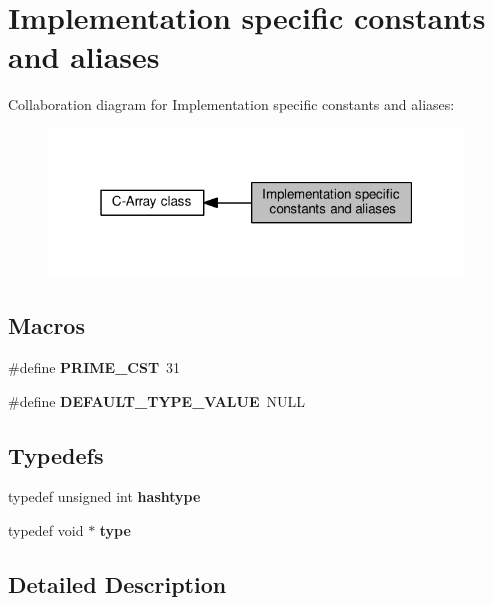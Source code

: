 \section{Implementation specific constants and aliases}
\label{group__impl__group}
Collaboration diagram for Implementation specific constants and aliases\+:\nopagebreak
\begin{figure}[H]
\begin{center}
\leavevmode
\includegraphics[width=313pt]{group__impl__group}
\end{center}
\end{figure}
\subsection*{Macros}
\begin{DoxyCompactItemize}
\item 
\#define {\bfseries P\+R\+I\+M\+E\+\_\+\+C\+ST}~31\label{group__impl__group_ga123c33de7154c282b66935373832c3d2}

\item 
\#define {\bfseries D\+E\+F\+A\+U\+L\+T\+\_\+\+T\+Y\+P\+E\+\_\+\+V\+A\+L\+UE}~N\+U\+LL\label{group__impl__group_ga48b008dd6b494f297c36976dbefde3a6}

\end{DoxyCompactItemize}
\subsection*{Typedefs}
\begin{DoxyCompactItemize}
\item 
typedef unsigned int {\bfseries hashtype}\label{group__impl__group_ga666aae09a1f6137dd5f36f54b7f0551f}

\item 
typedef void $\ast$ {\bfseries type}\label{group__impl__group_ga00adf28a743db83fba0f44c7533f8395}

\end{DoxyCompactItemize}


\subsection{Detailed Description}
